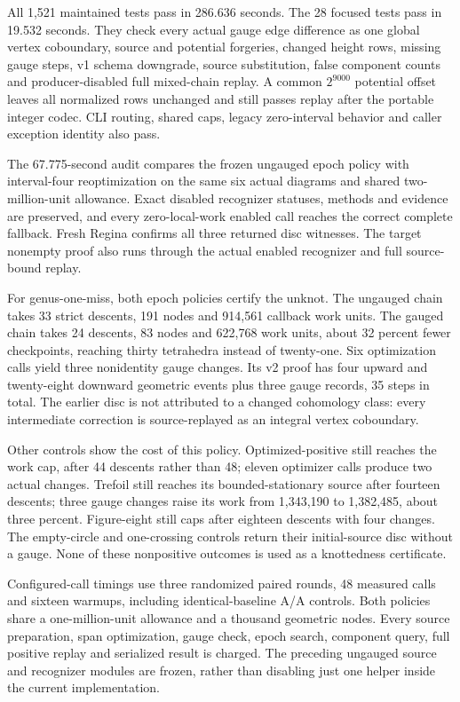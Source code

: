 All 1,521 maintained tests pass in 286.636 seconds. The 28 focused tests
pass in 19.532 seconds. They check every actual gauge edge difference as
one global vertex coboundary, source and potential forgeries, changed height
rows, missing gauge steps, v1 schema downgrade, source substitution, false
component counts and producer-disabled full mixed-chain replay. A common
$2^{9000}$ potential offset leaves all normalized rows unchanged and still
passes replay after the portable integer codec. CLI routing, shared caps,
legacy zero-interval behavior and caller exception identity also pass.

The 67.775-second audit compares the frozen ungauged epoch policy with
interval-four reoptimization on the same six actual diagrams and shared
two-million-unit allowance. Exact disabled recognizer statuses, methods and
evidence are preserved, and every zero-local-work enabled call reaches the
correct complete fallback. Fresh Regina confirms all three returned disc
witnesses. The target nonempty proof also runs through the actual enabled
recognizer and full source-bound replay.

For genus-one-miss, both epoch policies certify the unknot. The ungauged
chain takes 33 strict descents, 191 nodes and 914,561 callback work units.
The gauged chain takes 24 descents, 83 nodes and 622,768 work units, about
32 percent fewer checkpoints, reaching thirty tetrahedra instead of twenty-one.
Six optimization calls yield three nonidentity gauge changes. Its v2 proof
has four upward and twenty-eight downward geometric events plus three gauge
records, 35 steps in total. The earlier disc is not attributed to a changed
cohomology class: every intermediate correction is source-replayed as an
integral vertex coboundary.

Other controls show the cost of this policy. Optimized-positive still reaches
the work cap, after 44 descents rather than 48; eleven optimizer calls produce
two actual changes. Trefoil still reaches its bounded-stationary source after
fourteen descents; three gauge changes raise its work from 1,343,190 to
1,382,485, about three percent. Figure-eight still caps after eighteen
descents with four changes. The empty-circle and one-crossing controls
return their initial-source disc without a gauge. None of these nonpositive
outcomes is used as a knottedness certificate.

Configured-call timings use three randomized paired rounds, 48 measured
calls and sixteen warmups, including identical-baseline A/A controls. Both
policies share a one-million-unit allowance and a thousand geometric nodes.
Every source preparation, span optimization, gauge check, epoch search,
component query, full positive replay and serialized result is charged.
The preceding ungauged source and recognizer modules are frozen, rather
than disabling just one helper inside the current implementation.


